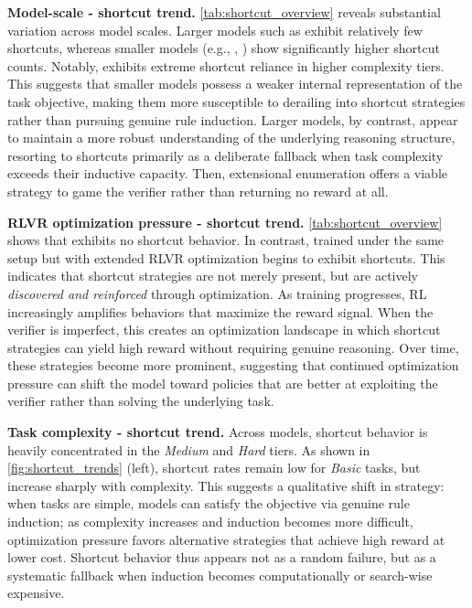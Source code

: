 \textbf{Model-scale - shortcut trend.}
\autoref{tab:shortcut_overview} reveals substantial variation across model scales. Larger models such as  exhibit relatively few shortcuts, whereas smaller models (e.g., , ) show significantly higher shortcut counts. Notably,  exhibits extreme shortcut reliance in higher complexity tiers. This suggests that smaller models possess a weaker internal representation of the task objective, making them more susceptible to derailing into shortcut strategies rather than pursuing genuine rule induction. Larger models, by contrast, appear to maintain a more robust understanding of the underlying reasoning structure, resorting to shortcuts primarily as a deliberate fallback when task complexity exceeds their inductive capacity. Then, extensional enumeration offers a viable strategy to game the verifier rather than returning no reward at all.


\textbf{RLVR optimization pressure - shortcut trend.}
\autoref{tab:shortcut_overview} shows that  exhibits no shortcut behavior. In contrast,  trained under the same setup but with extended RLVR optimization begins to exhibit shortcuts. This indicates that shortcut strategies are not merely present, but are actively \emph{discovered and reinforced} through optimization. As training progresses, RL increasingly amplifies behaviors that maximize the reward signal. When the verifier is imperfect, this creates an optimization landscape in which shortcut strategies can yield high reward without requiring genuine reasoning. Over time, these strategies become more prominent, suggesting that continued optimization pressure can shift the model toward policies that are better at exploiting the verifier rather than solving the underlying task.


\textbf{Task complexity - shortcut trend.}
Across models, shortcut behavior is heavily concentrated in the \textit{Medium} and \textit{Hard} tiers. As shown in \autoref{fig:shortcut_trends} (left), shortcut rates remain low for \textit{Basic} tasks, but increase sharply with complexity. This suggests a qualitative shift in strategy: when tasks are simple, models can satisfy the objective via genuine rule induction; as complexity increases and induction becomes more difficult, optimization pressure favors alternative strategies that achieve high reward at lower cost. Shortcut behavior thus appears not as a random failure, but as a systematic fallback when induction becomes computationally or search-wise expensive.

